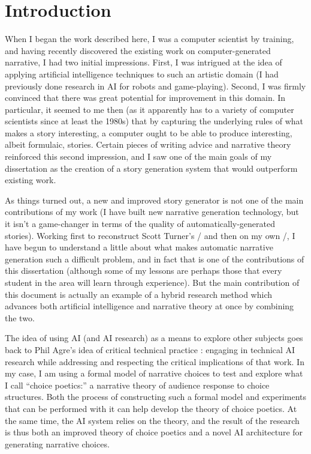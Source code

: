 \chapter{Introduction}

\label{ch:intro}

When I began the work described here, I was a computer scientist by training, and having recently discovered the existing work on computer-generated narrative, I had two initial impressions.
%
First, I was intrigued at the idea of applying artificial intelligence techniques to such an artistic domain (I had previously done research in AI for robots and game-playing).
%
Second, I was firmly convinced that there was great potential for improvement in this domain.
%
In particular, it seemed to me then (as it apparently has to a variety of computer scientists since at least the 1980s) that by capturing the underlying rules of what makes a story interesting, a computer ought to be able to produce interesting, albeit formulaic, stories.
%
Certain pieces of writing advice and narrative theory reinforced this second impression, and I saw one of the main goals of my dissertation as the creation of a story generation system that would outperform existing work.


As things turned out, a new and improved story generator is not one of the main contributions of my work (I have built new narrative generation technology, but it isn't a game-changer in terms of the quality of automatically-generated stories).
%
Working first to reconstruct Scott Turner's \minstrel/ \cite{Turner1993} and then on my own \dunyazad/, I have begun to understand a little about what makes automatic narrative generation such a difficult problem, and in fact that is one of the contributions of this dissertation (although some of my lessons are perhaps those that every student in the area will learn through experience).
%
But the main contribution of this document is actually an example of a hybrid research method which advances both artificial intelligence and narrative theory at once by combining the two.


The idea of using AI (and AI research) as a means to explore other subjects goes back to Phil Agre's idea of critical technical practice \cite{Agre19XX}: engaging in technical AI research while addressing and respecting the critical implications of that work.
%
In my case, I am using a formal model of narrative choices to test and explore what I call ``choice poetics:'' a narrative theory of audience response to choice structures.
%
Both the process of constructing such a formal model and experiments that can be performed with it can help develop the theory of choice poetics.
%
At the same time, the AI system relies on the theory, and the result of the research is thus both an improved theory of choice poetics and a novel AI architecture for generating narrative choices.


